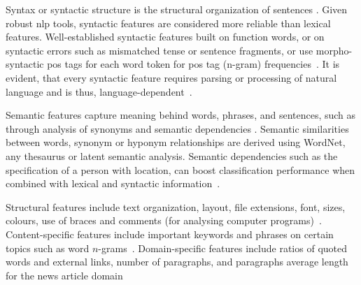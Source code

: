 \begin{table}[]
\centering
\caption{Comparison of a subset of lexical features~\citep{stamatatos_survey_2009}. Requirements refer to computational requirements such as a tokenizer.}
\label{tab:comp_lexical}
\end{table}

Syntax or syntactic structure is the structural organization of sentences \citep{kurt_pehlivanoglu_comparative_2024}.
Given robust \ac{nlp} tools, syntactic features are considered more reliable than lexical features.
Well-established syntactic features built on function words, or on syntactic errors such as mismatched tense or sentence fragments, or use morpho-syntactic \ac{pos} tags for each word token for \ac{pos} tag (n-gram) frequencies~\citep{abbasi_writeprints_2008,stamatatos_survey_2009}.
It is evident, that every syntactic feature requires parsing or processing of natural language and is thus, language-dependent~\citep{neal_surveying_2018,stamatatos_survey_2009}.

Semantic features capture meaning behind words, phrases, and sentences, such as through analysis of synonyms and semantic dependencies \citep{neal_surveying_2018}.
Semantic similarities between words, synonym or hyponym relationships are derived using WordNet, any thesaurus or latent semantic analysis.
Semantic dependencies such as the specification of a person with location, can boost classification performance when combined with lexical and syntactic information~\cite{stamatatos_survey_2009}.


Structural features include text organization, layout, file extensions, font, sizes, colours, 
use of braces and comments (for analysing computer programs)~\citep{abbasi_writeprints_2008,neal_surveying_2018}.
Content-specific features include important keywords and phrases on certain topics such as word $n$-grams~\citep{abbasi_writeprints_2008}.
Domain-specific features include ratios of quoted words and external links, number of paragraphs, and paragraphs average length for the news article domain~\citep{potthast_stylometric_2018}


